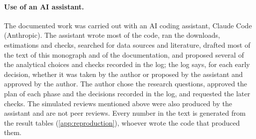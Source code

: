 \paragraph{Use of an AI assistant.} The documented work was carried out with an AI coding assistant, Claude Code (Anthropic). The assistant wrote most of the code, ran the downloads, estimations and checks, searched for data sources and literature, drafted most of the text of this monograph and of the documentation, and proposed several of the analytical choices and checks recorded in the log; the log says, for each early decision, whether it was taken by the author or proposed by the assistant and approved by the author. The author chose the research questions, approved the plan of each phase and the decisions recorded in the log, and requested the later checks. The simulated reviews mentioned above were also produced by the assistant and are not peer reviews. Every number in the text is generated from the result tables (\cref{app:reproduction}), whoever wrote the code that produced them.
